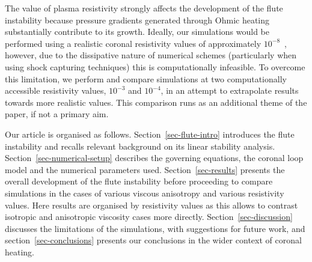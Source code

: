 \documentclass[fleqn,usenatbib]{mnras}
\newcommand{\rev}[1]{{\color{red} {#1}}}
\begin{document}
\rev{The value of plasma resistivity strongly affects the development of
the flute instability because pressure gradients generated through
Ohmic heating substantially contribute to its growth.
Ideally, our simulations would be performed using a realistic coronal
resistivity values of approximately
$10^{-8}$~\citep{craigAnisotropicViscousDissipation2009a}, however, due
to the dissipative nature of numerical schemes (particularly when using shock
capturing techniques) this is computationally infeasible.
To overcome this limitation, we perform and compare simulations at two computationally
accessible resistivity values, $10^{-3}$ and $10^{-4}$,
in an attempt to extrapolate results towards more realistic values.
This comparison runs as an additional theme of the paper,
if not a primary aim.}
%

Our article is organised as follows. Section~\ref{sec-flute-intro} introduces
the flute instability and \rev{recalls relevant background on its linear stability analysis}.
Section~\ref{sec-numerical-setup} describes the governing equations,
the coronal loop model and the numerical parameters used. Section~\ref{sec-results}
presents the overall development of the flute instability before
\rev{proceeding to compare simulations in the cases of various viscous
anisotropy and various resistivity values. Here results are
organised by resistivity values as this allows to contrast isotropic
and anisotropic viscosity cases more directly.}
Section~\ref{sec-discussion} discusses the limitations of the simulations, with
suggestions for future work, and section~\ref{sec-conclusions} presents our
conclusions in the wider context of coronal heating.
\end{document}
